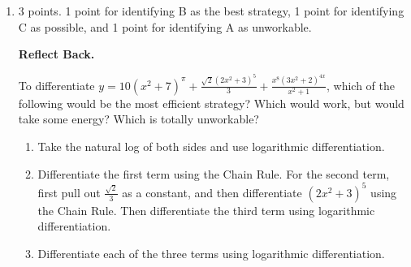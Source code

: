 \documentclass{article}
\begin{document}
\begin{enumerate}[topsep=0pt]
\begin{enumerate}
    \begin{solution}
      From our sign chart in {{{{\#4}}(b)}}, we can see
      that the global minimum of $f$ on $\left[
        \frac{1}{e^2}, e \right]$ must happen at $x = 1$.  The
      corresponding $y$-coordinate is $f(1) = 1^{\ln 1} = 1^0 = 1$, so the
      global minimum point is $\boxed{(1, 1)}$. 
    \end{solution}

  \item
    \begin{problem}[\vfill]
      Does the graph of $f(x)$ have an global maximum on the interval $\left[
        \frac{1}{e^2}, e \right]$?  If so, where?  (Give both the $x$- and
      $y$-coordinate.)
    \end{problem}

    \begin{solution} %
      $f$ must have an global maximum on $\left[ \frac{1}{e^2}, e
      \right]$ by the Extreme Value Theorem: we're dealing with a
      continuous function on a closed interval.  From our sign chart in
      {{{{\#4}}(b)}}, we can see that the maximum must
      occur at an endpoint.  To decide which, we just evaluate $f$ at both
      enedpoints: $f(e) = e^1 = e$ while $f(\frac{1}{e^2}) =
      (\frac{1}{e^2})^{-2} = e^4$, and $e^4$ is larger. So the maximum is
      at the point $\boxed{\left( \frac{1}{e^2}, e^4 \right)}$.
    \end{solution}

  \end{enumerate}

\item 
\begin{grading}
3 points. 1 point for identifying B as the best strategy, 1 point for identifying C as possible, and 1 point for identifying A as unworkable. 
\end{grading}

 \textbf{Reflect Back.}

  \begin{problem}[\stretch{1}]
    To differentiate $y =10 (x^2 + 7)^{\pi} +
    \displaystyle \frac{ \sqrt 2(2x^2 + 3)^{5}}{3} + 
    \frac{x^8(3x^2+2)^{4x}}{x^2+1}$, which of the following would be the most efficient strategy?
    Which would work, but would take some energy?  Which is totally unworkable?
    \begin{enumerate}[label=\protect\maybecircle{\Alph*.}]
    \item Take the natural log of both sides and use logarithmic
      differentiation.
    \item Differentiate the
      first term using the Chain Rule.  For the second term,
      first pull out $\frac{\sqrt 2}{3}$ as a constant, and then
      differentiate $(2x^2 + 3)^{5}$ using the Chain Rule.
      Then differentiate the third term using logarithmic differentiation.
    \item Differentiate each of
      the three terms using logarithmic differentiation.
    \end{enumerate}
  \end{problem}


\end{enumerate}
\end{document}
